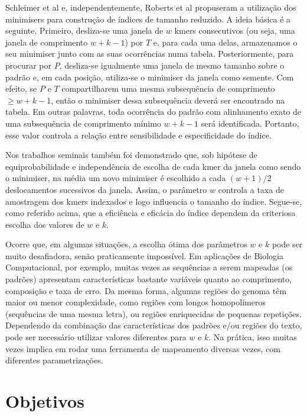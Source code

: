 \documentclass[12pt, a4paper, oneside]{article}
\begin{document}
Schleimer et al \cite{Schleimer2003} e, independentemente, Roberts et al \cite{Roberts2004} propuseram a utilização dos minimisers para construção de índices de tamanho reduzido. A ideia básica é a seguinte. Primeiro, desliza-se uma janela de $w$ kmers consecutivos (ou seja, uma janela de comprimento $w+k-1$) por $T$ e, para cada uma delas, armazenamos o seu minimiser junto com as suas ocorrências numa tabela. Posteriormente, para procurar por $P$, desliza-se igualmente uma janela de mesmo tamanho sobre o padrão e, em cada posição, utiliza-se o minimiser da janela como semente. Com efeito, se $P$ e $T$ compartilharem uma mesma subsequência de comprimento $\geq w+k-1$, então o minimiser dessa subsequência deverá ser encontrado na tabela. Em outras palavras, toda ocorrência do padrão com alinhamento exato de uma subsequência de comprimento mínimo $w+k-1$ será identificada. Portanto, esse valor controla a relação entre sensibilidade e especificidade do índice.

Nos trabalhos seminais \cite{Schleimer2003, Roberts2004} também foi demonstrado que, sob hipótese de equiprobabilidade e independência de escolha de cada kmer da janela como sendo o minimiser, na média um novo minimiser é escolhido a cada $(w+1)/2$ deslocamentos sucessivos da janela. Assim, o parâmetro $w$ controla a taxa de amostragem dos kmers indexados e logo influencia o tamanho do índice. Segue-se, como referido acima, que a eficiência e eficácia do índice dependem da criteriosa escolha dos valores de $w$ e $k$.

Ocorre que, em algumas situações, a escolha ótima dos parâmetros $w$ e $k$ pode ser muito desafiadora, senão praticamente impossível. Em aplicações de Biologia Computacional, por exemplo, muitas vezes as sequências a serem mapeadas (os padrões) apresentam características bastante variáveis quanto ao comprimento, composição e taxa de erro. Da mesma forma, algumas regiões do genoma têm maior ou menor complexidade, como regiões com longos homopolímeros (sequências de uma mesma letra), ou  regiões enriquecidas de pequenas repetições. Dependendo da combinação das características dos padrões e/ou regiões do texto, pode ser necessário utilizar valores diferentes para $w$ e $k$. Na prática, isso muitas vezes implica em rodar uma ferramenta de mapeamento diversas vezes, com diferentes parametrizações.



\clearpage
\section{Objetivos}
\end{document}
